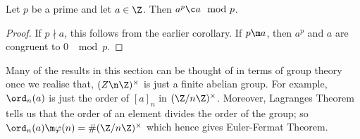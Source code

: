 \begin{nthm}
  Let $p$ be a prime and let $a \in \Z$. Then $a^p \c a \mod p$.
\end{nthm}
\begin{proof}
  If $p \nmid a$, this follows from the earlier corollary. If $p \m a$, then $a^p$ and $a$ are congruent to $0$ $\mod p$.
\end{proof}

\begin{remark}
   Many of the results in this section can be thought of in terms of group theory once we realise that, $(Z\n\Z)^\times$ is just a finite abelian group. For example, $\ord_n(a)$ is just the order of $[a]_n$ in $(\Z/n\Z)^\times$. Moreover, Lagranges Theorem tells us that the order of an element divides the order of the group; so $\ord_n(a) \m \varphi(n) = \#(\Z/ n\Z)^\times$ which hence gives Euler-Fermat Theorem.
\end{remark}
